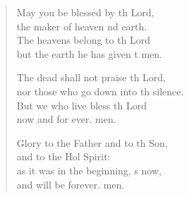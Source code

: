 \begin{verse}
\begin{patverse}
May you be blessed by th Lord,\Med\\
the maker of heaven nd earth.\\
The heavens belong to th Lord\Med\\
but the earth he has given t men.

The dead shall not praise th Lord,\Med\\
nor those who go down into th silence.\\
But we who live bless th Lord\Med\\
now and for ever. men.

Glory to the Father and to th Son,\Med\\
and to the Hol Spirit:\\
as it was in the beginning, \pointup{\i}s now,\Med\\
and will be forever. men. 
  \end{patverse}
\end{verse}
